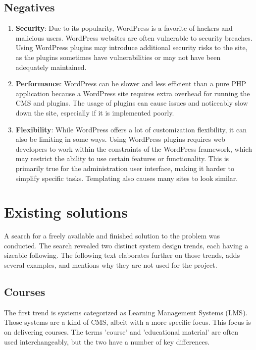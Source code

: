 \documentclass[
  digital,     %
  oneside,     %
  nosansbold,  %
  colorbold, %
  lof,         %
  lot,         %
]{fithesis4}
\begin{document}
\subsection{Negatives}

\begin{enumerate}
	
	\item \textbf{Security}: Due to its popularity, WordPress is a favorite of hackers
and malicious users. WordPress websites are often vulnerable to security breaches.
Using WordPress plugins may introduce additional security risks to the site, as the
plugins sometimes have vulnerabilities or may not have been adequately maintained.
	
	\item \textbf{Performance}: WordPress can be slower and less efficient than a pure
PHP application because a WordPress site requires extra overhead for running the CMS
and plugins. The usage of plugins can cause issues and noticeably slow down the site,
especially if it is implemented poorly.
	
	\item \textbf{Flexibility}: While WordPress offers a lot of customization flexibility,
it can also be limiting in some ways. Using WordPress plugins requires web developers
to work within the constraints of the WordPress framework, which may restrict the
ability to use certain features or functionality. This is primarily true for the administration
user interface, making it harder to simplify specific tasks. Templating also causes many
sites to look similar.

\end{enumerate}

\section{Existing solutions}

A search for a freely available and finished solution to the problem was conducted. The search revealed two distinct system design trends, each having a sizeable following. The following text elaborates further on those trends, adds several examples, and mentions why they are not used for the project.

\subsection{Courses}

The first trend is systems categorized as Learning Management Systems (LMS). Those systems are a kind of CMS, albeit with a more specific focus. This focus is on delivering courses. The terms 'course' and 'educational material' are often used interchangeably, but the two have a number of key differences.
\end{document}
